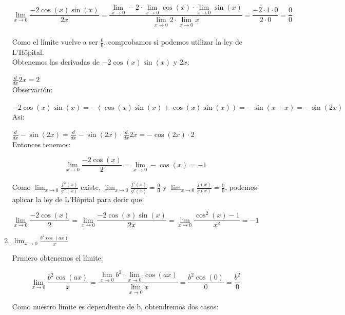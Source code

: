 \documentclass[12pt]{article}
\begin{document}
\begin{enumerate}[\hspace{9px} a)]
        \[\displaystyle\lim_{x \to 0}\frac{-2\cos(x)\sin(x)}{2x}=\frac{\displaystyle\lim_{x \to 0}-2 \cdot \displaystyle\lim_{x \to 0}\cos(x) \cdot \displaystyle\lim_{x \to 0}\sin(x)}{\displaystyle\lim_{x \to 0}2 \cdot \displaystyle\lim_{x \to 0}x} = \frac{-2 \cdot 1 \cdot 0}{2 \cdot 0}=\frac{0}{0}\]\\

        Como el l\'imite vuelve a ser $\displaystyle\frac{0}{0}$, comprobamos si podemos utilizar la ley de L'H\^opital.\\

        Obtenemos las derivadas de $-2\cos(x)\sin(x)$ y $2x$:

        \(\displaystyle\frac{d}{dx}2x=2\)\\
        
        Observaci\'on: 
        
        \(-2\cos(x)\sin(x)=-(\cos(x)\sin(x)+\cos(x)\sin(x))=-\sin(x+x)=-\sin(2x)\)\\

        Asi:

        \(\displaystyle\frac{d}{dx}-\sin(2x)=\frac{d}{dx}-\sin(2x) \cdot \frac{d}{dx}2x = -\cos(2x) \cdot 2\)\\

        Entonces tenemos:

        \[\displaystyle\lim_{x \to 0}\frac{-2\cos(x)}{2}=\displaystyle\lim_{x \to 0}-\cos(x)=-1\]\\

        Como \(\displaystyle\lim_{x \to 0}\frac{f''(x)}{g''(x)}\) existe, \(\displaystyle\lim_{x \to 0}\frac{f'(x)}{g'(x)}=\frac{0}{0}\) y \(\displaystyle\lim_{x \to 0}\frac{f(x)}{g(x)}=\frac{0}{0}\), podemos aplicar la ley de L'H\^opital para decir que:

        \[\displaystyle\lim_{x \to 0}\frac{-2\cos(x)}{2}=\displaystyle\lim_{x \to 0}\frac{-2\cos(x)\sin(x)}{2x}=\displaystyle\lim_{x \to 0}\frac{\cos^2(x)-1}{x^2}=-1\]\medskip

    \item \(\displaystyle\lim_{x \to 0}\frac{b^2\cos(ax)}{x}\)\medskip
    
        Prmiero obtenemos el l\'imite:

        \[\displaystyle\lim_{x \to 0}\frac{b^2\cos(ax)}{x}= \frac{\displaystyle\lim_{x \to 0}b^2 \cdot \lim_{x \to 0}\cos(ax)}{\displaystyle\lim_{x \to 0}x} = \frac{b^2\cos(0)}{0}=\frac{b^2}{0}\]

        Como nuestro l\'imite es dependiente de b, obtendremos dos casos:


\end{enumerate}
\end{document}
